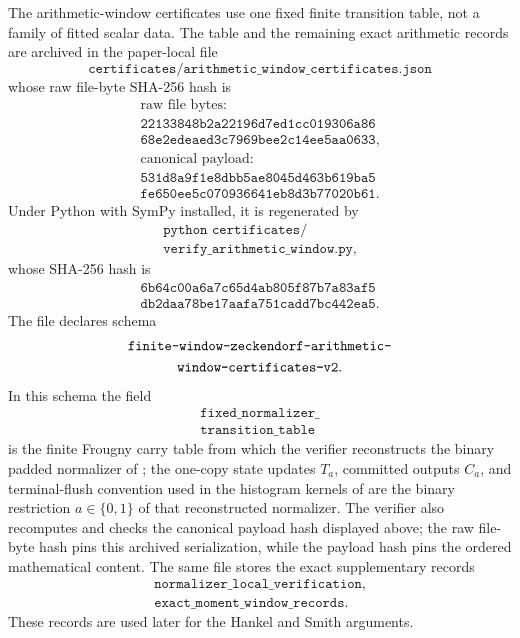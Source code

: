 \begin{proposition}
\label{prop:pinned-normalizer-certificate-table}
The arithmetic-window certificates use one fixed finite transition table, not a
family of fitted scalar data.  The table and the remaining exact arithmetic
records are archived in the paper-local file
\begingroup
\sloppy
\[
  \texttt{certificates/arithmetic\_window\_certificates.json}
\]
whose raw file-byte SHA-256 hash is
\[
\begin{gathered}
\text{raw file bytes:}\\
\texttt{22133848b2a22196d7ed1cc019306a86}\\
\texttt{68e2edeaed3c7969bee2c14ee5aa0633},\\
\text{canonical payload:}\\
\texttt{531d8a9f1e8dbb5ae8045d463b619ba5}\\
\texttt{fe650ee5c070936641eb8d3b77020b61}.
\end{gathered}
\]
Under Python with SymPy installed, it is regenerated by
\[
\begin{gathered}
\texttt{python certificates/}\\
\texttt{verify\_arithmetic\_window.py},
\end{gathered}
\]
whose SHA-256 hash is
\[
\begin{gathered}
  \texttt{6b64c00a6a7c65d4ab805f87b7a83af5}\\
  \texttt{db2daa78be17aafa751cadd7bc442ea5}.
\end{gathered}
\]
The file declares schema
\[
\begin{gathered}
\texttt{finite-window-zeckendorf-arithmetic-}\\
\texttt{window-\allowbreak certificates-v2}.
\end{gathered}
\]
In this schema the field
\[
\begin{gathered}
\texttt{fixed\_normalizer\_}\\
\texttt{transition\_table}
\end{gathered}
\]
is the finite Frougny carry table from which the verifier reconstructs the
binary padded normalizer of
; the one-copy state updates
\(T_a\), committed outputs \(C_a\), and terminal-flush convention used in the
histogram kernels of  are the binary
restriction \(a\in\{0,1\}\) of that reconstructed normalizer.  The verifier also
recomputes and checks the canonical payload hash displayed above; the raw
file-byte hash pins this archived serialization, while the payload hash pins
the ordered mathematical content.  The same file stores the exact supplementary
records
\[
\begin{gathered}
\texttt{normalizer\_local\_verification},\\
\texttt{exact\_moment\_window\_records}.
\end{gathered}
\]
These records are used later for the Hankel and Smith arguments.
\endgroup
\end{proposition}

